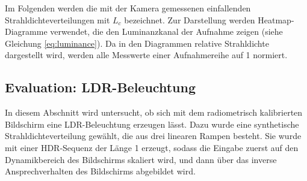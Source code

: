     Im Folgenden werden die mit der Kamera gemessenen einfallenden Strahldichteverteilungen mit $L_c$ bezeichnet. 
    Zur Darstellung werden Heatmap-Diagramme verwendet, die den Luminanzkanal der Aufnahme zeigen (siehe Gleichung \ref{eq:luminance}).
    Da in den Diagrammen relative Strahldichte dargestellt wird, werden alle Messwerte einer Aufnahmereihe auf 1 normiert.


 \subsection{Evaluation: LDR-Beleuchtung} 
     In diesem Abschnitt wird untersucht, ob sich mit dem radiometrisch kalibrierten Bildschirm eine LDR-Beleuchtung erzeugen lässt.
     Dazu wurde eine synthetische Strahldichteverteilung gewählt, die aus drei linearen Rampen besteht. 
     Sie wurde mit einer HDR-Sequenz der Länge 1 erzeugt, sodass die Eingabe zuerst auf den Dynamikbereich des Bildschirms skaliert wird, und dann über das inverse Ansprechverhalten des Bildschirms abgebildet wird.
   
     
  
